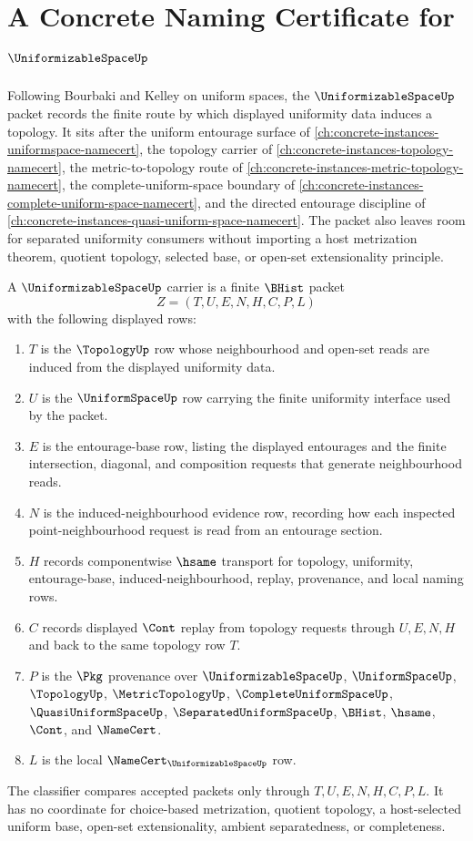 \chapter{A Concrete Naming Certificate for $\UniformizableSpaceUp$}
\label{ch:concrete-instances-uniformizable-space-namecert}

Following Bourbaki and Kelley on uniform spaces, the $\UniformizableSpaceUp$ packet records the finite route by which displayed uniformity data induces a topology. It sits after the uniform entourage surface of \autoref{ch:concrete-instances-uniformspace-namecert}, the topology carrier of \autoref{ch:concrete-instances-topology-namecert}, the metric-to-topology route of \autoref{ch:concrete-instances-metric-topology-namecert}, the complete-uniform-space boundary of \autoref{ch:concrete-instances-complete-uniform-space-namecert}, and the directed entourage discipline of \autoref{ch:concrete-instances-quasi-uniform-space-namecert}. The packet also leaves room for separated uniformity consumers without importing a host metrization theorem, quotient topology, selected base, or open-set extensionality principle.

\begin{definition}
\label{def:uniformizable-space-carrier}
A $\UniformizableSpaceUp$ carrier is a finite $\BHist$ packet
$$
Z=(T,U,E,N,H,C,P,L)
$$
with the following displayed rows:
\begin{enumerate}
\item $T$ is the $\TopologyUp$ row whose neighbourhood and open-set reads are induced from the displayed uniformity data.
\item $U$ is the $\UniformSpaceUp$ row carrying the finite uniformity interface used by the packet.
\item $E$ is the entourage-base row, listing the displayed entourages and the finite intersection, diagonal, and composition requests that generate neighbourhood reads.
\item $N$ is the induced-neighbourhood evidence row, recording how each inspected point-neighbourhood request is read from an entourage section.
\item $H$ records componentwise $\hsame$ transport for topology, uniformity, entourage-base, induced-neighbourhood, replay, provenance, and local naming rows.
\item $C$ records displayed $\Cont$ replay from topology requests through $U,E,N,H$ and back to the same topology row $T$.
\item $P$ is the $\Pkg$ provenance over $\UniformizableSpaceUp$, $\UniformSpaceUp$, $\TopologyUp$, $\MetricTopologyUp$, $\CompleteUniformSpaceUp$, $\QuasiUniformSpaceUp$, $\SeparatedUniformSpaceUp$, $\BHist$, $\hsame$, $\Cont$, and $\NameCert$.
\item $L$ is the local $\NameCert_{\UniformizableSpaceUp}$ row.
\end{enumerate}
The classifier compares accepted packets only through $T,U,E,N,H,C,P,L$. It has no coordinate for choice-based metrization, quotient topology, a host-selected uniform base, open-set extensionality, ambient separatedness, or completeness.
\end{definition}

